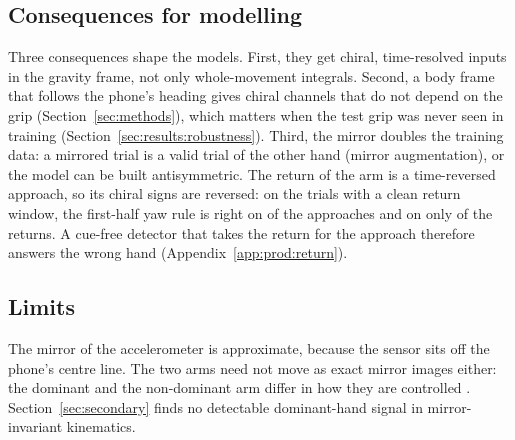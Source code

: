 \subsection{Consequences for modelling}\label{sec:physics:consequences}
Three consequences shape the models. First, they get chiral, time-resolved inputs in the gravity frame, not only
whole-movement integrals. Second, a body frame that follows the phone's heading gives chiral channels that do not
depend on the grip (Section~\ref{sec:methods}), which matters when the test grip was never seen in training
(Section~\ref{sec:results:robustness}). Third, the mirror doubles the training data: a mirrored trial is a valid
trial of the other hand (mirror augmentation), or the model can be built antisymmetric. The return of the arm is a
time-reversed approach, so its chiral signs are reversed: on the  trials with a clean
return window, the first-half yaw rule is right on  of the approaches and on
only  of the returns.
A cue-free detector that takes the return for the approach therefore answers the wrong hand
(Appendix~\ref{app:prod:return}).

\subsection{Limits}\label{sec:physics:limits}
The mirror of the accelerometer is approximate, because the sensor sits off the phone's centre line. The two arms
need not move as exact mirror images either: the dominant and the non-dominant arm differ in how they are
controlled \cite{sainburg2002dominance,przybyla2012dominance}. Section~\ref{sec:secondary} finds no detectable
dominant-hand signal in mirror-invariant kinematics.
